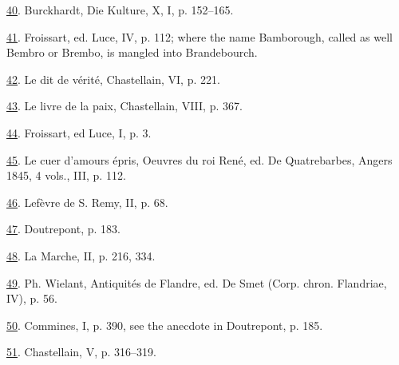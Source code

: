 \protect\hypertarget{23_NOTES.xhtmlux5cux23id_1854}{\protect\hyperlink{10_Chapter_Three__THE_HEROIC_DREAM.xhtmlux5cux23id_1853}{40}}.
Burckhardt, Die Kulture, X, I, p. 152--165.

\protect\hypertarget{23_NOTES.xhtmlux5cux23id_1852}{\protect\hyperlink{10_Chapter_Three__THE_HEROIC_DREAM.xhtmlux5cux23id_1851}{41}}.
Froissart, ed. Luce, IV, p. 112; where the name Bamborough, called as
well Bembro or Brembo, is mangled into Brandebourch.

\protect\hypertarget{23_NOTES.xhtmlux5cux23id_1850}{\protect\hyperlink{10_Chapter_Three__THE_HEROIC_DREAM.xhtmlux5cux23id_1849}{42}}.
Le dit de vérité, Chastellain, VI, p. 221.

\protect\hypertarget{23_NOTES.xhtmlux5cux23id_1848}{\protect\hyperlink{10_Chapter_Three__THE_HEROIC_DREAM.xhtmlux5cux23id_1847}{43}}.
Le livre de la paix, Chastellain, VIII, p. 367.

\protect\hypertarget{23_NOTES.xhtmlux5cux23id_1846}{\protect\hyperlink{10_Chapter_Three__THE_HEROIC_DREAM.xhtmlux5cux23id_1845}{44}}.
Froissart, ed Luce, I, p. 3.

\protect\hypertarget{23_NOTES.xhtmlux5cux23id_1844}{\protect\hyperlink{10_Chapter_Three__THE_HEROIC_DREAM.xhtmlux5cux23id_1843}{45}}.
Le cuer d'amours épris, Oeuvres du roi René, ed. De Quatrebarbes, Angers
1845, 4 vols., III, p. 112.

\protect\hypertarget{23_NOTES.xhtmlux5cux23id_1842}{\protect\hyperlink{10_Chapter_Three__THE_HEROIC_DREAM.xhtmlux5cux23id_1841}{46}}.
Lefèvre de S. Remy, II, p. 68.

\protect\hypertarget{23_NOTES.xhtmlux5cux23id_1840}{\protect\hyperlink{10_Chapter_Three__THE_HEROIC_DREAM.xhtmlux5cux23id_1839}{47}}.
Doutrepont, p. 183.

\protect\hypertarget{23_NOTES.xhtmlux5cux23id_1838}{\protect\hyperlink{10_Chapter_Three__THE_HEROIC_DREAM.xhtmlux5cux23id_1837}{48}}.
La Marche, II, p. 216, 334.

\protect\hypertarget{23_NOTES.xhtmlux5cux23id_1836}{\protect\hyperlink{10_Chapter_Three__THE_HEROIC_DREAM.xhtmlux5cux23id_1835}{49}}.
Ph. Wielant, Antiquités de Flandre, ed. De Smet (Corp. chron. Flandriae,
IV), p. 56.

\protect\hypertarget{23_NOTES.xhtmlux5cux23id_1834}{\protect\hyperlink{10_Chapter_Three__THE_HEROIC_DREAM.xhtmlux5cux23id_1833}{50}}.
Commines, I, p. 390, see the anecdote in Doutrepont, p. 185.

\protect\hypertarget{23_NOTES.xhtmlux5cux23id_1832}{\protect\hyperlink{10_Chapter_Three__THE_HEROIC_DREAM.xhtmlux5cux23id_1831}{51}}.
Chastellain, V, p. 316--319.

